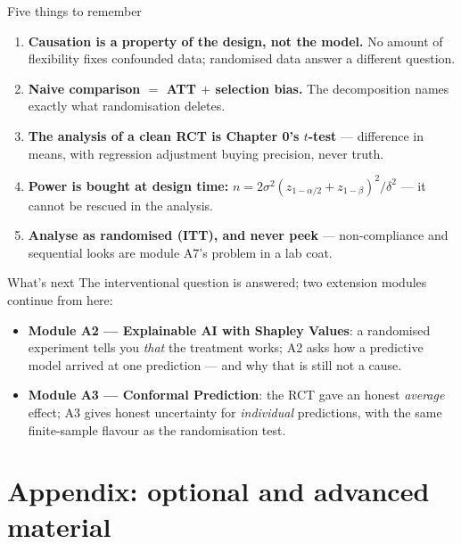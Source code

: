 \documentclass[aspectratio=169,11pt]{beamer}
\begin{document}
\begin{frame}{Five things to remember}
  \begin{takeaway}
    \begin{enumerate}
      \item \textbf{Causation is a property of the design, not the model.} No amount of
            flexibility fixes confounded data; randomised data answer a different question.
      \item \textbf{Naive comparison $=$ ATT $+$ selection bias.} The decomposition names
            exactly what randomisation deletes.
      \item \textbf{The analysis of a clean RCT is Chapter 0's $t$-test} --- difference in
            means, with regression adjustment buying precision, never truth.
      \item \textbf{Power is bought at design time:}
            $n = 2\sigma^2(z_{1-\alpha/2}+z_{1-\beta})^2/\delta^2$ --- it cannot be
            rescued in the analysis.
      \item \textbf{Analyse as randomised (ITT), and never peek} --- non-compliance and
            sequential looks are module A7's problem in a lab coat.
    \end{enumerate}
  \end{takeaway}
\end{frame}

\begin{frame}{What's next}
  The interventional question is answered; two extension modules continue from here:
  \begin{itemize}
    \item \textbf{Module A2 --- Explainable AI with Shapley Values}: a randomised
          experiment tells you \emph{that} the treatment works; A2 asks how a
          predictive model arrived at one prediction --- and why that is still
          not a cause.
    \item \textbf{Module A3 --- Conformal Prediction}: the RCT gave an honest
          \emph{average} effect; A3 gives honest uncertainty for \emph{individual}
          predictions, with the same finite-sample flavour as the randomisation test.
  \end{itemize}
\end{frame}


\appendix
\AtBeginSection[]{}
\section{Appendix: optional and advanced material}
\end{document}
